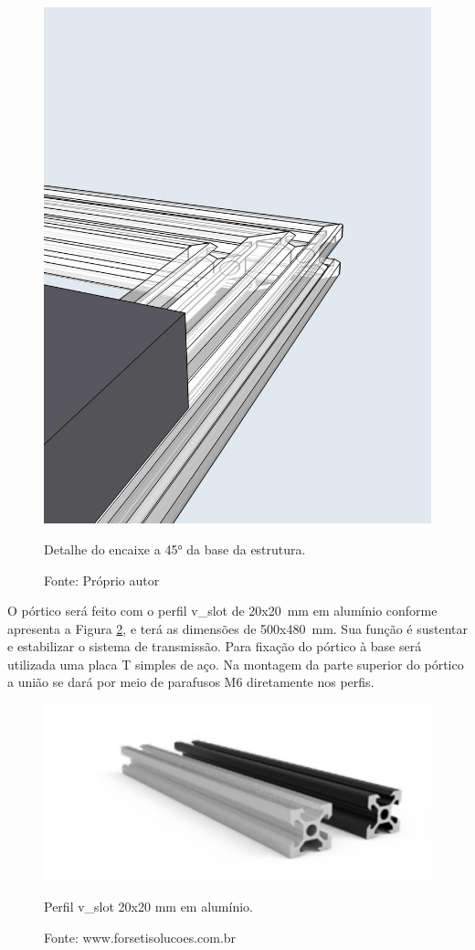 \begin{figure}[!htb]
\centering
\includegraphics[scale = 0.25]{figuras/3-6}
\caption{Detalhe do encaixe a 45° da base da estrutura.}
\caption*{Fonte: Próprio autor}
\label{fig:detalhe45}
\end{figure}
    
O pórtico será feito com o perfil v\_slot de 20x20~mm em alumínio conforme apresenta 
a Figura \ref{fig:p20x20p}, e terá as dimensões de 500x480~mm. Sua função é sustentar 
e estabilizar o sistema de transmissão. Para fixação do pórtico à base será utilizada 
uma placa T simples de aço. Na montagem da parte superior do pórtico a união 
se dará por meio de parafusos M6 diretamente nos perfis.

\begin{figure}[!htb]
\centering
\includegraphics[scale = 0.5]{figuras/3-7}
\caption{Perfil v\_slot 20x20 mm em alumínio.}
\caption*{Fonte: www.forsetisolucoes.com.br}
\label{fig:p20x20p}
\end{figure}
    
